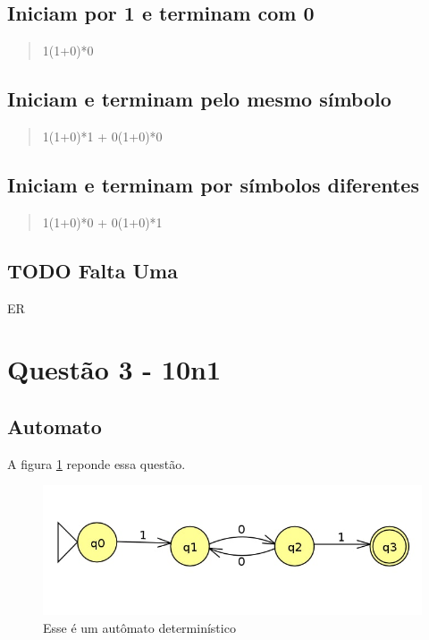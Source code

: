 \documentclass[11pt]{article}
\begin{document}
\subsection{Iniciam por 1 e terminam com 0}
\label{sec:org1515c3d}

\begin{quote}
1(1+0)*0 
\end{quote}

\subsection{Iniciam e terminam pelo mesmo símbolo}
\label{sec:org142ed9a}

\begin{quote}
1(1+0)*1 + 0(1+0)*0 
\end{quote}

\subsection{Iniciam e terminam por símbolos diferentes}
\label{sec:org1c1ce7c}

\begin{quote}
1(1+0)*0 + 0(1+0)*1 
\end{quote}

\subsection{{\bfseries\sffamily TODO} Falta Uma}
\label{sec:orga70b434}

ER 

\section{Questão 3 - 10n1}
\label{sec:org8c8d310}
\subsection{Automato}
\label{sec:org3a87f93}
A figura \ref{fig:org86f7852} reponde essa questão. 

\begin{figure}[htbp]
\centering
\includegraphics[width=.9\linewidth]{./q3/q3.jpg}
\caption{\label{fig:org86f7852}
Esse é um autômato determinístico}
\end{figure}
\end{document}

